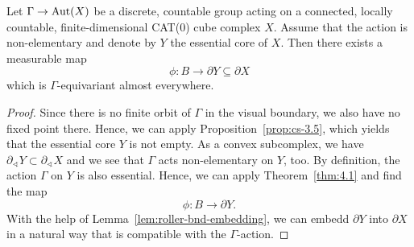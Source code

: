 \begin{cor}
  \label{cor:4.2}
  Let \(\Gamma \to \operatorname{Aut}(X)\) be a discrete, countable group acting on a connected, locally countable, finite-dimensional CAT(0) cube complex \(X\). Assume that the action is non-elementary and denote by \(Y\) the essential core of \(X\). Then there exists a measurable map
  \[
    \phi \colon B \to \partial Y \subseteq \partial X
  \]
  which is \(\Gamma\)-equivariant almost everywhere.
\end{cor}

\begin{proof}
  Since there is no finite orbit of \(\Gamma\) in the visual boundary, we also have no fixed point there. Hence, we can apply Proposition~\ref{prop:cs-3.5}, which yields that the essential core \(Y\) is not empty. As a convex subcomplex, we have \(\partial_\sphericalangle Y \subset \partial_\sphericalangle X\) and we see that \(\Gamma\) acts non-elementary on \(Y\), too. By definition, the action \(\Gamma\) on \(Y\) is also essential. Hence, we can apply Theorem~\ref{thm:4.1} and find the map
  \[
    \phi\colon B \to \partial Y.
  \]
  With the help of Lemma~\ref{lem:roller-bnd-embedding}, we can embedd \(\partial Y\) into \(\partial X\) in a natural way that is compatible with the \(\Gamma\)-action.
\end{proof}

